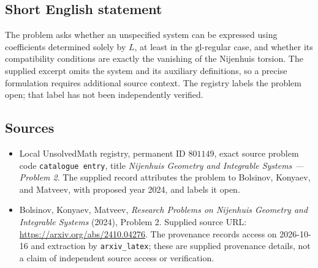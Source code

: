 \documentclass[11pt]{article}
\begin{document}
\subsection{Short English statement}
The problem asks whether an unspecified system can be expressed using coefficients determined solely by \(L\), at least in the \(\mathrm{gl}\)-regular case, and whether its compatibility conditions are exactly the vanishing of the Nijenhuis torsion. The supplied excerpt omits the system and its auxiliary definitions, so a precise formulation requires additional source context. The registry labels the problem open; that label has not been independently verified.
\subsection{Sources}
\begin{itemize}
\item Local UnsolvedMath registry, permanent ID \(801149\), exact source problem code \texttt{catalogue entry}, title \emph{Nijenhuis Geometry and Integrable Systems --- Problem 2}. The supplied record attributes the problem to Bolsinov, Konyaev, and Matveev, with proposed year 2024, and labels it open.
\item Bolsinov, Konyaev, Matveev, \emph{Research Problems on Nijenhuis Geometry and Integrable Systems} (2024), Problem 2. Supplied source URL: \url{https://arxiv.org/abs/2410.04276}. The provenance records access on 2026-10-16 and extraction by \texttt{arxiv\_latex}; these are supplied provenance details, not a claim of independent source access or verification.
\end{itemize}
\end{document}
